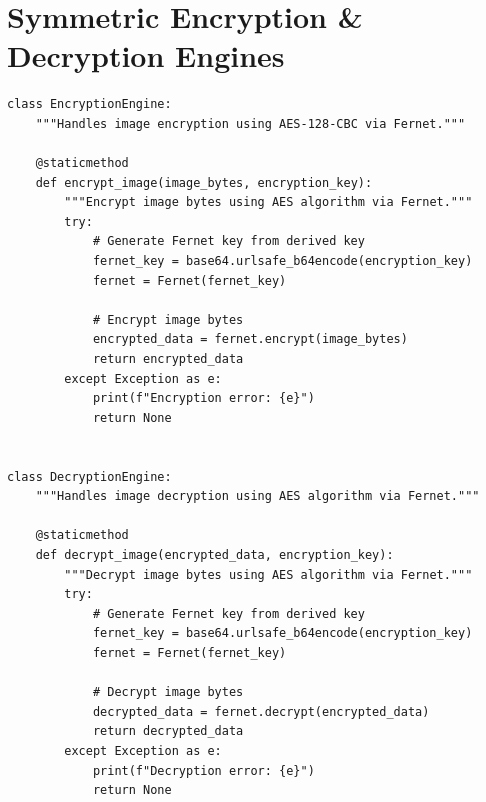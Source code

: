 \documentclass[12pt,a4paper]{report}
\begin{document}
\section{Symmetric Encryption \& Decryption Engines}
\begin{lstlisting}
class EncryptionEngine:
    """Handles image encryption using AES-128-CBC via Fernet."""
    
    @staticmethod
    def encrypt_image(image_bytes, encryption_key):
        """Encrypt image bytes using AES algorithm via Fernet."""
        try:
            # Generate Fernet key from derived key
            fernet_key = base64.urlsafe_b64encode(encryption_key)
            fernet = Fernet(fernet_key)
            
            # Encrypt image bytes
            encrypted_data = fernet.encrypt(image_bytes)
            return encrypted_data
        except Exception as e:
            print(f"Encryption error: {e}")
            return None


class DecryptionEngine:
    """Handles image decryption using AES algorithm via Fernet."""
    
    @staticmethod
    def decrypt_image(encrypted_data, encryption_key):
        """Decrypt image bytes using AES algorithm via Fernet."""
        try:
            # Generate Fernet key from derived key
            fernet_key = base64.urlsafe_b64encode(encryption_key)
            fernet = Fernet(fernet_key)
            
            # Decrypt image bytes
            decrypted_data = fernet.decrypt(encrypted_data)
            return decrypted_data
        except Exception as e:
            print(f"Decryption error: {e}")
            return None
\end{lstlisting}
\end{document}
